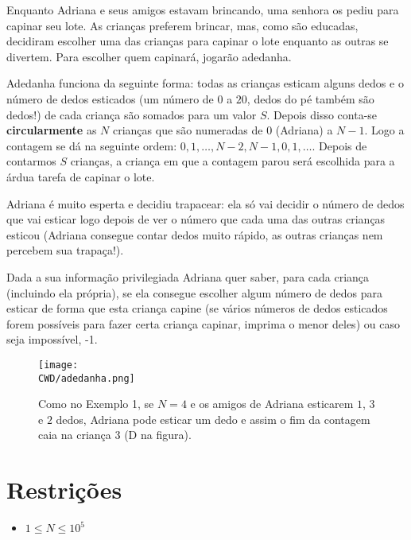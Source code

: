 Enquanto Adriana e seus amigos estavam brincando, uma senhora os pediu para capinar seu lote. As crianças preferem brincar, mas, como são educadas, decidiram escolher uma das crianças para capinar o lote enquanto as outras se divertem. Para escolher quem capinará, jogarão adedanha.

Adedanha funciona da seguinte forma: todas as crianças esticam alguns dedos e o número de dedos esticados (um número de $0$ a $20$, dedos do pé também são dedos!) de cada criança são somados para um valor $S$. Depois disso conta-se \textbf{circularmente} as $N$ crianças que são numeradas de $0$ (Adriana) a $N - 1$. Logo a contagem se dá na seguinte ordem: $0, 1, \ldots, N - 2, N - 1, 0, 1, \ldots$. Depois de contarmos $S$ crianças, a criança em que a contagem parou será escolhida para a árdua tarefa de capinar o lote.

Adriana é muito esperta e decidiu trapacear: ela só vai decidir o número de dedos que vai esticar logo depois de ver o número que cada uma das outras crianças esticou (Adriana consegue contar dedos muito rápido, as outras crianças nem percebem sua trapaça!).

Dada a sua informação privilegiada Adriana quer saber, para cada criança (incluindo ela própria), se ela consegue escolher algum número de dedos para esticar de forma que esta criança capine (se vários números de dedos esticados forem possíveis para fazer certa criança capinar, imprima o menor deles) ou caso seja impossível, -1.

\begin{figure}[H]
    \centering
    \texttt{[image: \\CWD/adedanha.png]}
    \caption{Como no Exemplo 1, se $N = 4$ e os amigos de Adriana esticarem $1$, $3$ e $2$ dedos, Adriana pode esticar um dedo e assim o fim da contagem caia na criança $3$ (D na figura).}
\end{figure}



\section*{Restrições}

\begin{itemize}
\item $1 \leq N \leq 10^5$
\end{itemize}

\sampleio